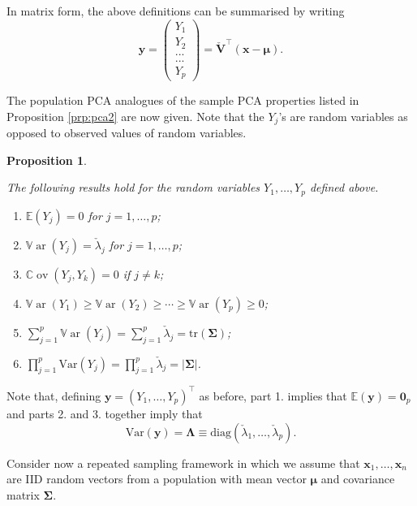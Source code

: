 \documentclass[
]{book}
\newtheorem{proposition}{Proposition}[chapter]
\theoremstyle{definition}
\theoremstyle{definition}
\theoremstyle{definition}
\theoremstyle{definition}
\theoremstyle{remark}
\begin{document}
In matrix form, the above definitions can be summarised by writing
\[
\mathbf y=\begin{pmatrix} Y_1 \\ Y_2 \\ ... \\...\\Y_p   \end{pmatrix} = \check{\mathbf V}^\top (\mathbf x-{\pmb \mu}).
\]

The population PCA analogues of the sample PCA properties listed in Proposition \ref{prp:pca2} are now given. Note that the
\(Y_j\)'s are random variables as opposed to observed values of random variables.

\begin{proposition}
\protect\hypertarget{prp:pca3}{}\label{prp:pca3}

The following results hold for the random variables \(Y_1, \ldots , Y_p\) defined above.

\begin{enumerate}
\def\labelenumi{\arabic{enumi}.}
\item
  \({\mathbb{E}}(Y_j)=0\) for \(j=1, \ldots , p\);
\item
  \({\mathbb{V}\operatorname{ar}}(Y_j)=\check{\lambda}_j\) for \(j=1,\ldots, p\);
\item
  \({\mathbb{C}\operatorname{ov}}(Y_j,Y_k)=0\) if \(j \neq k\);
\item
  \({\mathbb{V}\operatorname{ar}}(Y_1) \geq {\mathbb{V}\operatorname{ar}}(Y_2) \geq \cdots \geq {\mathbb{V}\operatorname{ar}}(Y_p) \geq 0\);
\item
  \(\sum_{j=1}^p {\mathbb{V}\operatorname{ar}}(Y_j)=\sum_{j=1}^p \check{\lambda}_j=\text{tr}(\boldsymbol{\Sigma})\);
\item
  \(\prod_{j=1}^p \text{Var}(Y_j)=\prod_{j=1}^p \check{\lambda}_j=\vert \boldsymbol{\Sigma}\vert\).
\end{enumerate}

\end{proposition}

Note that, defining \(\mathbf y=(Y_1, \ldots , Y_p)^\top\) as before, part 1. implies that \({\mathbb{E}}(\mathbf y)={\mathbf 0}_p\) and parts 2. and 3. together imply that
\[
\text{Var}(\mathbf y)=\boldsymbol \Lambda\equiv \text{diag}(\check{\lambda}_1, \ldots , \check{\lambda}_p).
\]

Consider now a repeated sampling framework in which we assume that \(\mathbf x_1, \ldots , \mathbf x_n\) are IID random vectors from a population
with mean vector \(\pmb \mu\) and covariance matrix \(\boldsymbol{\Sigma}\).
\end{document}
